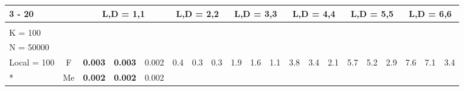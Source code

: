 \documentclass[french,10pt]{article}
\begin{document}
    \begin{landscape}




\setlength\tabcolsep{0.07cm}
\begin{longtable}{ l c | c c c | c c c | c c c | c c c | c c c | c c c | }
    \cline{3 -  20 }

        
&
& \multicolumn{3}{|c}{
    L,D = 1,1 }     & \multicolumn{3}{|c}{
    L,D = 2,2 }     & \multicolumn{3}{|c}{
    L,D = 3,3 }     & \multicolumn{3}{|c}{
    L,D = 4,4 }     & \multicolumn{3}{|c}{
    L,D = 5,5 }     & \multicolumn{3}{|c|}{
L,D = 6,6 }  \\     

    \endfirsthead
    \endhead
    \endfoot
    \endlastfoot

    \hline
    \multirow{6}{*}{
    \makecell{ \textbf{ $(x_{i}) \mapsto (\exp(x_{i}) )$ } \\
    {\small K = 100 } \\
    {\small N = 50000 } \\ {\small Local = 100 }}
    }

                & {\small F  }

    &                                         \textbf{ 0.003}
    & {\footnotesize                         \textbf{ 0.003}
    } & {\footnotesize                         0.002
    }


    & 0.4
    & {\footnotesize                         0.3
    } & {\footnotesize                         0.3
    }


    & 1.9
    & {\footnotesize                         1.6
    } & {\footnotesize                         1.1
    }


    & 3.8
    & {\footnotesize                         3.4
    } & {\footnotesize                         2.1
    }


    & 5.7
    & {\footnotesize                         5.2
    } & {\footnotesize                         2.9
    }


    & 7.6
    & {\footnotesize                         7.1
    } & {\footnotesize                         3.4
    }
    
    
                    \\*
                        & {\small Me  }

    &                                         \textbf{ 0.002}
    & {\footnotesize                         \textbf{ 0.002}
    } & {\footnotesize                         0.002
    }



\end{longtable}
\end{landscape}
\end{document}
